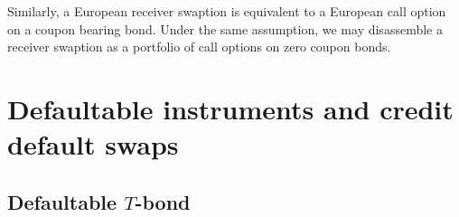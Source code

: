 Similarly, a European receiver swaption is equivalent to a European call option on a coupon bearing bond. Under the same assumption, we may disassemble a receiver swaption as a portfolio of call options on zero coupon bonds.

\iffalse

\subsection{Eurodollar futures}

Eurodollar futures is a contract that will swap
	\begin{align}
		1- \Rflt(T,S)
	\end{align}
with
	\begin{align}
		1 - \FUT(t,T,S)
	\end{align}
at the time $T$, where $t < T < S$ and the futures rate $\FUT(t,T,S)$ is set so that entering futures contract at the time $t$ costs nothing. Futures contracts are resettled continuously, meaning that for a small time horizon $\delta > 0$, the owner of a futures contract will have a cash flow of
	\begin{align}
		\FUT(s,T,S) - \FUT(s+\delta,T,S) .
	\end{align}
In practice, resettlement is done daily. As $\FUT(T,T,S) = \Rflt (T,S)$, the holder of a futures contract has experienced undiscounted net cash flow of
	\begin{align}
		\sum\limits_{t \leq s < T} \left( \FUT(s,T,S) - \FUT(s+\delta,T,S) \right) = \FUT(t,T,S) - \Rflt (T,S) ,
	\end{align}
but we note this number contains undiscounted cash flows from different point of times. If interest rates raises, the futures contract will lose value. On the other hand, falling interest rates will make contract more valuable. Assuming that the rates of different tenor move in unison, the refinancing cost of settling a move of $n>0$ basis points is higher than the benefits of reinvesting gains from a movement of $-n$ basis points.

\fi

\section{Defaultable instruments and credit default swaps}

\subsection{Defaultable $T$-bond}

